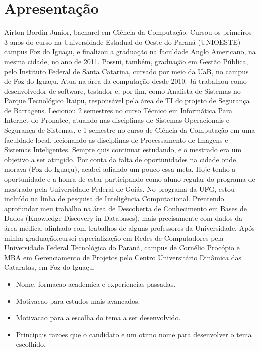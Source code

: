 \documentclass[a4paper,11pt]{article}
\begin{document}
\section{Apresentação}
Airton Bordin Junior, bacharel em Ciência da Computação. Cursou os primeiros 3 anos do curso na Universidade Estadual do Oeste do Paraná (UNIOESTE) campus Foz do Iguaçu, e finalizou a graduação na faculdade Anglo Americano, na mesma cidade, no ano de 2011.
Possui, também, graduação em Gestão Pública, pelo Instituto Federal de Santa Catarina, cursado por meio da UaB, no campus de Foz do Iguaçu.
Atua na área da computação desde 2010. Já trabalhou como desenvolvedor de software, testador e, por fim, como Analista de Sistemas no Parque Tecnológico Itaipu, responsável pela área de TI do projeto de Segurança de Barragens.
Lecionou 2 semestres no curso Técnico em Informática Para Internet do Pronatec, atuando nas disciplinas de Sistemas Operacionais e Segurança de Sistemas, e 1 semestre no curso de Ciência da Computação em uma faculdade local, lecionando as disciplinas de Processamento de Imagens e Sistemas Inteligentes.
Sempre quis continuar estudando, e o mestrado era um objetivo a ser atingido. Por conta da falta de oportunidades na cidade onde morava (Foz do Iguaçu), acabei adiando um pouco essa meta. Hoje tenho a oportunidade e a honra de estar participando como aluno regular do programa de mestrado pela Universidade Federal de Goiás.
No programa da UFG, estou incluído na linha de pesquisa de Inteligência Computacional. Prentendo aprofundar meu trabalho na área de Descoberta de Conhecimento em Bases de Dados (Knowledge Discovery in Databases), mais precisamente com dados da área médica, alinhado com trabalhos de alguns professores da Universidade.
Após minha graduação,cursei especialização em Redes de Computadores pela Universidade Federal Tecnológica do Paraná, campus de Cornélio Procópio e MBA em Gerenciamento de Projetos pelo Centro Universitário Dinâmica das Cataratas, em Foz do Iguaçu.

\begin{itemize}
\item{Nome, formacao academica e experiencias passadas.}
\item{Motivacao para estudos mais avancados.}
\item{Motivacao para a escolha do tema a ser desenvolvido.}
\item{Principais razoes que o candidato e um otimo nome para desenvolver o tema escolhido.}
\end{itemize}
\end{document}
